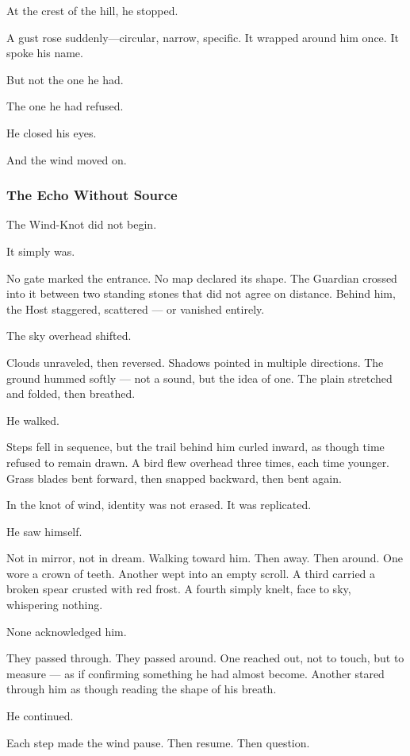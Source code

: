 \documentclass[12pt]{article}
\begin{document}
At the crest of the hill, he stopped.

A gust rose suddenly—circular, narrow, specific. It wrapped around him once. It spoke his name.

But not the one he had.

The one he had refused.

He closed his eyes.

And the wind moved on.

\dotfill

\subsubsection{The Echo Without Source}

The Wind-Knot did not begin.

It simply was.

No gate marked the entrance. No map declared its shape. The Guardian crossed into it between two standing stones that did not agree on distance. Behind him, the Host staggered, scattered — or vanished entirely.

The sky overhead shifted.

Clouds unraveled, then reversed. Shadows pointed in multiple directions. The ground hummed softly — not a sound, but the idea of one. The plain stretched and folded, then breathed.

He walked.

Steps fell in sequence, but the trail behind him curled inward, as though time refused to remain drawn. A bird flew overhead three times, each time younger. Grass blades bent forward, then snapped backward, then bent again.

In the knot of wind, identity was not erased. It was replicated.

He saw himself.

Not in mirror, not in dream. Walking toward him. Then away. Then around. One wore a crown of teeth. Another wept into an empty scroll. A third carried a broken spear crusted with red frost. A fourth simply knelt, face to sky, whispering nothing.

None acknowledged him.

They passed through. They passed around. One reached out, not to touch, but to measure — as if confirming something he had almost become. Another stared through him as though reading the shape of his breath.

He continued.

Each step made the wind pause. Then resume. Then question.
\end{document}
